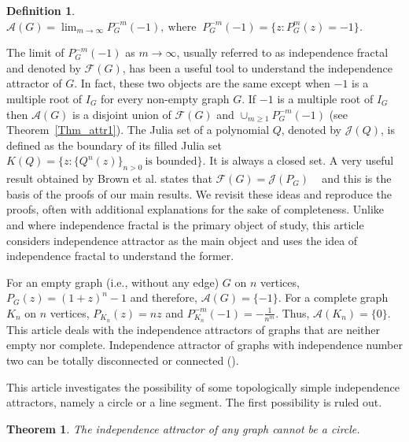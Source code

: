 \documentclass[12pt,a4paper]{article}
\theoremstyle{plain}
\newtheorem{maintheorem}{Theorem}
\newtheorem{definition}{Definition}[section]
\numberwithin{equation}{section}
\begin{document}
\begin{definition}$\mathcal{A}(G) =  \lim_{m\rightarrow \infty} P_G ^{-m}(-1),~\mbox{where }~ P_G ^{-m}(-1) =\{z: P_G^m (z)=-1\}$.
\end{definition}
The limit of $P_G ^{-m}(-1)$ as $m \to \infty$, usually referred to as independence fractal and denoted by $\mathcal{F}(G)$, has been a useful tool to understand the independence attractor  of $G$. In fact,  these two objects are the same except when $-1$ is a multiple root of $I_G$ for every non-empty graph $G$.  If $-1$ is a multiple root of $I_G $ then  $\mathcal{A}(G)$ is a disjoint union of $\mathcal{F}(G)$ and $\cup_{m \geq 1} P_G ^{-m}(-1)$ (see Theorem~\ref{Thm_attr1}). The Julia set of a polynomial $Q$, denoted by  $\mathcal{J}(Q)$, is defined as the boundary of its filled Julia set $K(Q)=\{z: \{Q^n(z)\}_{n>0} ~\mbox{is bounded}\}$. It is always a closed set.  A very useful result obtained by Brown et al.  states that $\mathcal{F}(G) =\mathcal{J}(P_G)$ ~\cite{brownetal2003} and this is the basis of the proofs of our main results. We revisit these ideas and reproduce the proofs, often with additional explanations for the sake of completeness. Unlike ~\cite{brownetal2003} and \cite{tk-barik-20} where independence fractal is the primary object of study, this article considers independence attractor as the main object and uses the idea of independence fractal to understand the former.
\par
For an empty graph (i.e., without any edge) $G$ on $n$ vertices,  $P_G (z)= (1+z)^n -1$ and therefore, $\mathcal{A}(G) =\{-1\}$. For a complete graph $K_n$ on $n$ vertices, $P_{K_n} (z)=nz$ and $P^{-m}_{K_n}(-1)=-\frac{1}{n^m}$. Thus, $\mathcal{A}(K_n)=\{0\}$. This article deals with the independence attractors of graphs that are neither  empty nor complete. Independence attractor of graphs with independence number two can be totally disconnected or connected (\cite{hickman2001}). 

 
This article investigates the possibility of some topologically simple independence attractors, namely a circle or a line segment. The first possibility is ruled out.  
\begin{maintheorem}
The  independence attractor of any graph cannot be a circle.
\label{nocircle}
\end{maintheorem}
\end{document}
